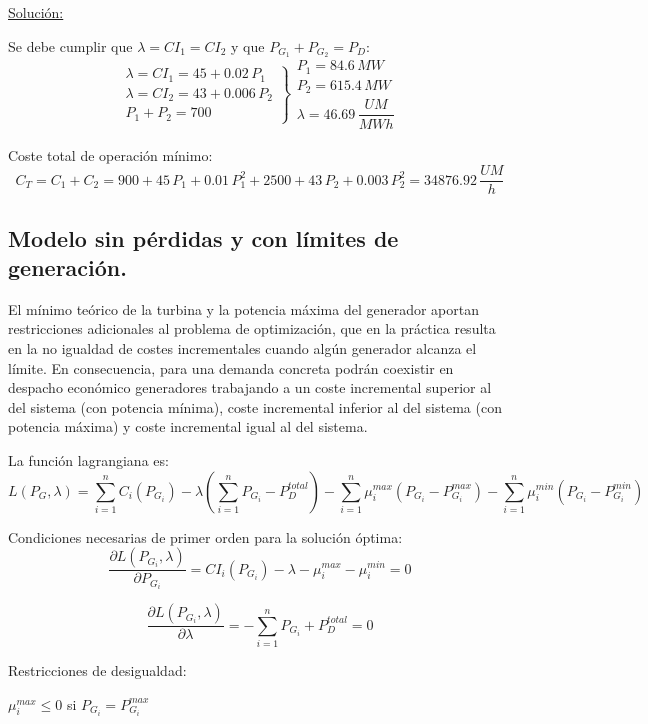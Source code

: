 			
			\underline{Solución:}
			
			
			Se debe cumplir que $\lambda = CI_1 = CI_2$ y que $P_{G_1} + P_{G_2} = P_D$:
			\[
			\left.
			\begin{matrix}
				\lambda = CI_1 = 45+0.02\,P_1\\
				\lambda = CI_2 = 43+0.006\,P_2\\
				P_1 + P_2 = 700
			\end{matrix}
			\right\}
			\begin{matrix}
				P_1 = 84.6\,MW\\
				P_2 = 615.4\,MW\\
				\lambda = 46.69\,\dfrac{UM}{MWh}
			\end{matrix}
			\]
			
			Coste total de operación mínimo:
			\[C_T = C_1 + C_2 = 900 + 45\,P_1 + 0.01\,P_1^2+2500+43\,P_2+0.003\,P_2^2 = 34876.92\,\dfrac{UM}{h}\]
		
		\subsection{Modelo sin pérdidas y con límites de generación.}
			El mínimo teórico de la turbina y la potencia máxima del generador aportan restricciones adicionales al problema de optimización, que en la práctica resulta en la no igualdad de costes incrementales cuando algún generador alcanza el límite. En consecuencia, para una demanda concreta podrán coexistir en despacho económico generadores trabajando a un coste incremental superior al del sistema (con potencia mínima), coste incremental inferior al del sistema (con potencia máxima) y coste incremental igual al del sistema.
			
			
			La función lagrangiana es:
			\[L(P_G,\lambda) = \sum_{i=1}^{n} C_i(P_{G_i}) - \lambda \left(\sum_{i=1}^{n} P_{G_i} - P_D^{total}\right) - \sum_{i=1}^{n} \mu_i^{max} (P_{G_i} - P_{G_i}^{max}) - \sum_{i=1}^{n} \mu_i^{min} (P_{G_i} - P_{G_i}^{min})\]
			
			Condiciones necesarias de primer orden para la solución óptima:
			\[\dfrac{\partial L(P_{G_i},\lambda)}{\partial P_{G_i}} = CI_i(P_{G_i})-\lambda - \mu_i^{max}-\mu_i^{min} = 0\]
				
			\[\dfrac{\partial L(P_{G_i},\lambda)}{\partial \lambda} = -\sum_{i=1}^{n} P_{G_i} + P_D^{total} = 0\]
			
			
			Restricciones de desigualdad:
			
			$\mu_i^{max} \leq 0$ si $P_{G_i} = P_{G_i}^{max}$
			
